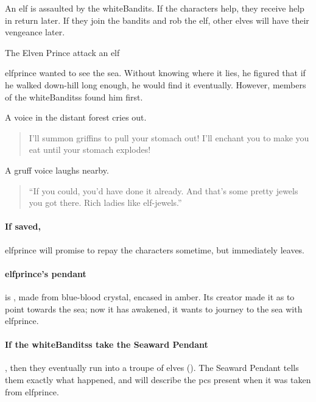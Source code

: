 \label{littleprince}

\noindent
An elf is assaulted by the \gls{whiteBandits}.
If the characters help, they receive help in return later.
If they join the bandits and rob the elf, other elves will have their vengeance later.

{The Elven Prince}%
{ attack an elf}%

\Gls{elfprince} wanted to see the sea.
Without knowing where it lies, he figured that if he walked down-hill long enough, he would find it eventually.
However, members of the \glspl{whiteBandits} found him first.

\begin{boxtext}
  A voice in the distant forest cries out.
  \begin{quote}
    I'll summon griffins to pull your stomach out!  I'll enchant you to make you eat until your stomach explodes!
  \end{quote}

  A gruff voice laughs nearby.

  \begin{quote}
    ``If you could, you'd have done it already.  And that's some pretty jewels you got there.  Rich ladies like elf-jewels.''
  \end{quote}

\end{boxtext}


\paragraph{If saved,}
\gls{elfprince} will promise to repay the characters sometime, but immediately leaves.

\paragraph{\Gls{elfprince}'s pendant}
is , made from blue-blood crystal, encased in amber.
Its creator made it as  to point towards the sea; now it has awakened, it wants to journey to the sea with \gls{elfprince}.

\paragraph{If the \glspl{whiteBandits} take the Seaward Pendant},
then they eventually run into a troupe of elves ().
The Seaward Pendant tells them exactly what happened, and will describe the \glspl{pc} present when it was taken from \gls{elfprince}.

